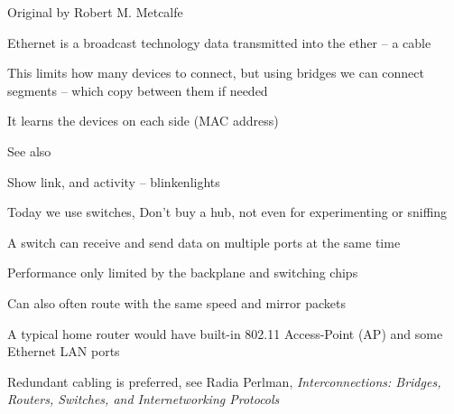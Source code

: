 \documentclass[Screen16to9,17pt]{foils}
\begin{document}

Original by Robert M. Metcalfe

\begin{list2}
\item Ethernet is a broadcast technology data transmitted into the ether -- a cable
\item This limits how many devices to connect, but using bridges we can connect segments -- which copy between them if needed
\item It learns the devices on each side (MAC address)
\item See also 
\end{list2}






\centerline{Show link, and activity -- blinkenlights}




\begin{list1}
\item Today we use switches, Don't buy a hub, not even for experimenting or sniffing
\item A switch can receive and send data on multiple ports at the same time
\item Performance only limited by the backplane and switching chips
\item Can also often route with the same speed and mirror packets
\end{list1}




\begin{list1}
\item A typical home router would have built-in 802.11 Access-Point (AP) and some Ethernet LAN ports
\end{list1}




Redundant cabling is preferred, see Radia Perlman, \emph{Interconnections: Bridges, Routers, Switches, and Internetworking Protocols}

\end{document}
